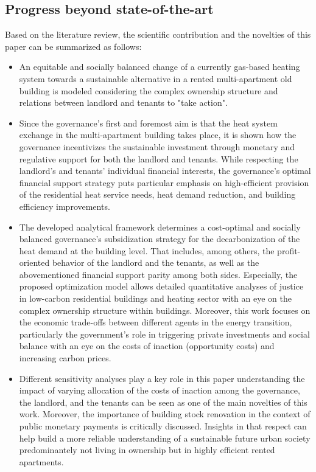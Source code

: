 \subsection{Progress beyond state-of-the-art}\label{novelties}
Based on the literature review, the scientific contribution and the novelties of this paper can be summarized as follows:
\begin{itemize}
	\item An equitable and socially balanced change of a currently gas-based heating system towards a sustainable alternative in a rented multi-apartment old building is modeled considering the complex ownership structure and relations between landlord and tenants to "take action".
	\item Since the governance's first and foremost aim is that the heat system exchange in the multi-apartment building takes place, it is shown how the governance incentivizes the sustainable investment through monetary and regulative support for both the landlord and tenants. While respecting the landlord's and tenants' individual financial interests, the governance's optimal financial support strategy puts particular emphasis on high-efficient provision of the residential heat service needs, heat demand reduction, and building efficiency improvements.
	\item The developed analytical framework determines a cost-optimal and socially balanced governance’s subsidization strategy for the decarbonization of the heat demand at the building level. That includes, among others, the profit-oriented behavior of the landlord and the tenants, as well as the abovementioned financial support parity among both sides.  Especially, the proposed optimization model allows detailed quantitative analyses of justice in low-carbon residential buildings and heating sector with an eye on the complex ownership structure within buildings. Moreover, this work focuses on the economic trade-offs between different agents in the energy transition, particularly the government’s role in triggering private investments and social balance with an eye on the costs of inaction (opportunity costs) and increasing carbon prices.	
	\item Different sensitivity analyses play a key role in this paper understanding the impact of varying allocation of the costs of inaction among the governance, the landlord, and the tenants can be seen as one of the main novelties of this work. Moreover, the importance of building stock renovation in the context of public monetary payments is critically discussed. Insights in that respect can help build a more reliable understanding of a sustainable future urban society predominantely not living in ownership but in highly efficient rented apartments.
\end{itemize}